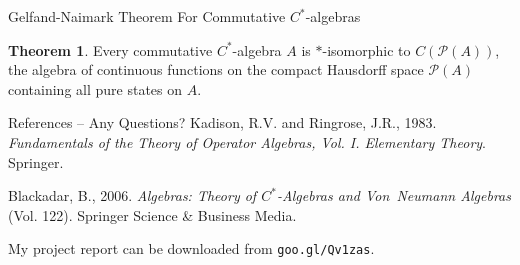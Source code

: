 \documentclass[11pt]{beamer}
\theoremstyle{definition}
\newtheorem{thm}{Theorem}
\renewcommand{\P}[1]{\mathscr{P}(#1)}
\begin{document}
\iffalse
\begin{frame} {Gelfand-Naimark Theorem} {Proof: Direct Sum}
	Proof concludes by taking `direct sum' representation over the representations 
	given by doing GNS construction to a subset of state space containing all pure 
	states. This gives a faithful representation.
\end{frame}\fi


\begin{frame} {Gelfand-Naimark Theorem} {For Commutative $C^\ast$-algebras}
	\begin{thm}
		Every commutative $C^\ast$-algebra $A$ is $\ast$-isomorphic to $C(\P A)$, the 
		algebra of continuous functions on the compact Hausdorff space $\P A$ containing 
		all pure states on $A$. 
	\end{thm}
\end{frame} 


\begin{frame} {References -- Any Questions?}
	Kadison, R.V. and Ringrose, J.R., 1983. 
	\textit{Fundamentals of the Theory of Operator Algebras, Vol. I. Elementary Theory}. 
	Springer.
	
	Blackadar, B., 2006. 
	\textit{Algebras: Theory of $C^\ast$-Algebras and Von~Neumann 
	Algebras} (Vol. 122). 
	Springer Science \& Business Media.

	\vfill

	My project report can be downloaded from \texttt{goo.gl/Qv1zas}.
\end{frame}
\end{document}
